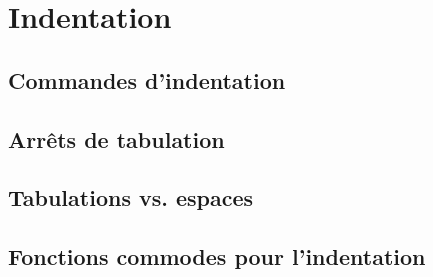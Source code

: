 \chapter{Indentation}\label{chap21}
\section{Commandes d'indentation}\label{chap21sec1}
\section{Arrêts de tabulation}\label{chap21sec2}
\section{Tabulations vs. espaces}\label{chap21sec3}
\section{Fonctions commodes pour l'indentation}\label{chap21sec4}

